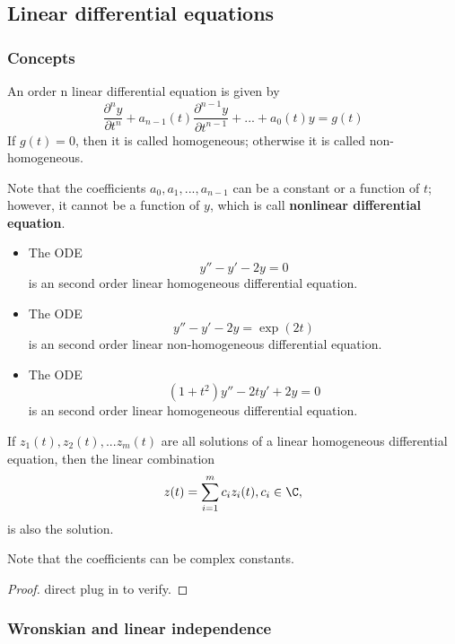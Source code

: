 \begin{refsection}
\subsection{Linear differential equations}
\subsubsection{Concepts}
\begin{definition}
An order n linear differential equation is given by $$\frac{\partial^n y}{\partial t^n} + a_{n-1}(t)\frac{\partial^{n-1} y}{\partial t^{n-1}} + ... + a_0(t) y = g(t)$$
If $g(t) = 0$, then it is called homogeneous; otherwise it is called non-homogeneous.
\end{definition}

\begin{remark}[caution!]
Note that the coefficients $a_0,a_1,...,a_{n-1}$ can be a constant or a function of $t$; however, it cannot be a function of $y$, which is call \textbf{nonlinear differential equation}.	
\end{remark}

\begin{example}\hfill
\begin{itemize}
	\item The ODE
	$$y'' - y' -2y = 0$$
	is an second order linear homogeneous differential equation.
	\item The ODE
	$$y'' - y' -2y = \exp(2t)$$
	is an second order linear non-homogeneous differential equation.
	\item The ODE
	$$(1+t^2)y'' - 2ty' + 2y = 0$$
	is an second order linear homogeneous differential equation.
\end{itemize}	
\end{example}


\begin{theorem}\label{ch:dynamical-systems:th:linearityOfSolutionsLinearHomogeneousODE}
If $z_1(t),z_2(t),...z_m(t)$ are all solutions of a linear homogeneous differential equation, then the linear combination 
$$z(t) = \sum_{i=1}^m c_i z_i(t),c_i\in \C,$$
is also the solution.

Note that the coefficients can be complex constants.
\end{theorem}
\begin{proof}
direct plug in to verify.
\end{proof}


\subsubsection{Wronskian and linear independence}


\end{refsection}
